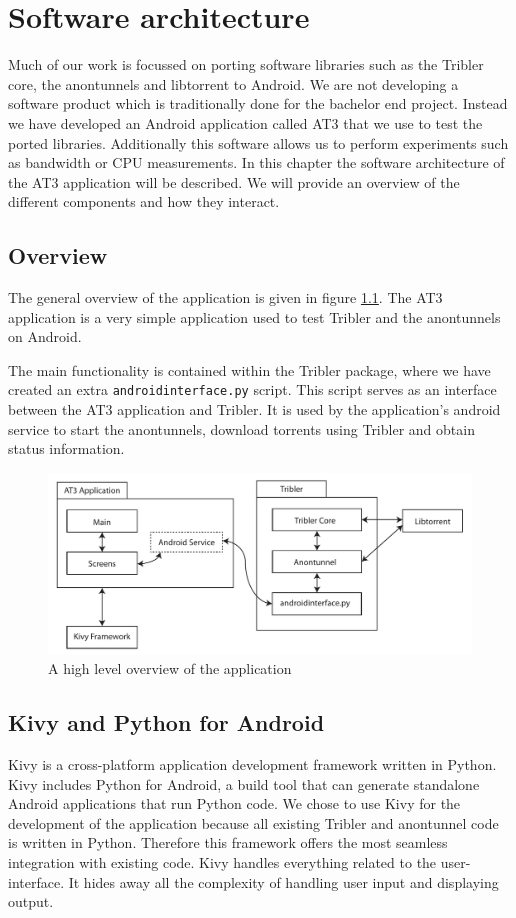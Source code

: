 \chapter{Software architecture}
Much of our work is focussed on porting software libraries such as the Tribler core, the anontunnels and libtorrent to Android. We are not developing a software product which is traditionally done for the bachelor end project. Instead we have developed an Android application called AT3 that we use to test the ported libraries. Additionally this software allows us to perform experiments such as bandwidth or CPU measurements.
In this chapter the software architecture of the AT3 application will be described. We will provide an overview of the different components and how they interact.

\section{Overview}
The general overview of the application is given in figure \ref{fig:overview}. The AT3 application is a very simple application used to test Tribler and the anontunnels on Android.

The main functionality is contained within the Tribler package, where we have created an extra \texttt{androidinterface.py} script. This script serves as an interface between the AT3 application and Tribler. It is used by the application's android service to start the anontunnels, download torrents using Tribler and obtain status information. 

\begin{figure}[h]
	\centering
	\includegraphics[width=\textwidth]{graphics/overview.pdf}
	\caption{A high level overview of the application}
	\label{fig:overview}
\end{figure}

\section{Kivy and Python for Android}
Kivy is a cross-platform application development framework written in Python. Kivy includes Python for Android, a build tool that can generate standalone Android applications that run Python code. We chose to use Kivy for the development of the application because all existing Tribler and anontunnel code is written in Python. Therefore this framework offers the most seamless integration with existing code. Kivy handles everything related to the user-interface. It hides away all the complexity of handling user input and displaying output.

